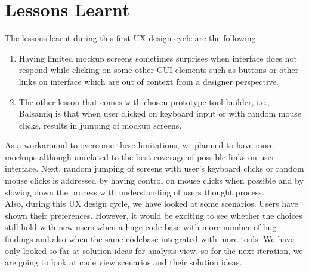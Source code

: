 \section{Lessons Learnt}

The lessons learnt during this first UX design cycle are the following. \\

\begin{enumerate}
\item Having limited mockup screens sometimes surprises when interface does not respond while clicking on some other GUI elements such as buttons or other links on interface which are out of context from a designer perspective.
\item The other lesson that comes with chosen prototype tool builder, i.e., Balsamiq is that when user clicked on keyboard input or with random mouse clicks, results in jumping of mockup screens.  \\
\end{enumerate}

As a workaround to overcome these limitations, we planned to have more mockups although unrelated to the best coverage of possible links on user interface. Next, random jumping of screens with user's keyboard clicks or random mouse clicks is addressed by having control on mouse clicks when possible and by slowing down the process with understanding of users thought process. \\

Also, during this UX design cycle, we have looked at some scenarios. Users have shown their preferences. However, it would be exciting to see whether the choices still hold with new users when a huge code base with more number of bug findings and also when the same codebase integrated with more tools. We have only looked so far at solution ideas for analysis view, so for the next iteration, we are going to look at code view scenarios and their solution ideas.

\let\cleardoublepage\clearpage
\emptypage